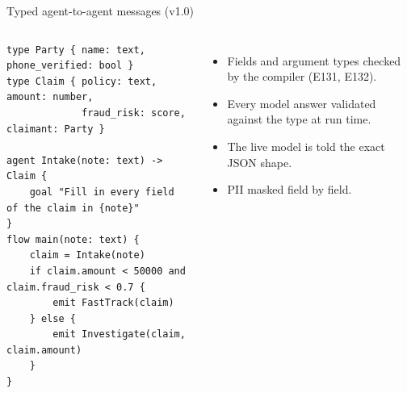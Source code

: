 \documentclass[aspectratio=169,10pt]{beamer}
\begin{document}
\begin{frame}[fragile]{Typed agent-to-agent messages (v1.0)}
\begin{columns}[T]
\begin{lstlisting}[language=AlgoLang]
type Party { name: text, phone_verified: bool }
type Claim { policy: text, amount: number,
             fraud_risk: score, claimant: Party }

agent Intake(note: text) -> Claim {
    goal "Fill in every field of the claim in {note}"
}
flow main(note: text) {
    claim = Intake(note)
    if claim.amount < 50000 and claim.fraud_risk < 0.7 {
        emit FastTrack(claim)
    } else {
        emit Investigate(claim, claim.amount)
    }
}
\end{lstlisting}
\begin{itemize}\setlength\itemsep{5pt}\small
\item Fields and argument types checked by the compiler (E131, E132).
\item Every model answer validated against the type at run time.
\item The live model is told the exact JSON shape.
\item PII masked field by field.
\end{itemize}
\end{columns}
\end{frame}
\end{document}
